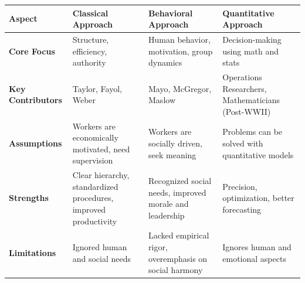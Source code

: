 \documentclass[10pt,a4paper]{book}
\begin{document}
\begin{tabular}{|p{4cm}|p{4cm}|p{4cm}|p{5cm}|}
\hline
\textbf{Aspect} & \textbf{Classical Approach} & \textbf{Behavioral Approach} & \textbf{Quantitative Approach} \\
\hline
\textbf{Core Focus} & Structure, efficiency, authority & Human behavior, motivation, group dynamics & Decision-making using math and stats \\
\hline
\textbf{Key Contributors} & Taylor, Fayol, Weber & Mayo, McGregor, Maslow & Operations Researchers, Mathematicians (Post-WWII) \\
\hline
\textbf{Assumptions} & Workers are economically motivated, need supervision & Workers are socially driven, seek meaning & Problems can be solved with quantitative models \\
\hline
\textbf{Strengths} & Clear hierarchy, standardized procedures, improved productivity & Recognized social needs, improved morale and leadership & Precision, optimization, better forecasting \\
\hline
\textbf{Limitations} & Ignored human and social needs & Lacked empirical rigor, overemphasis on social harmony & Ignores human and emotional aspects \\
\hline
\end{tabular}

\vspace{0.5cm}
\end{document}
